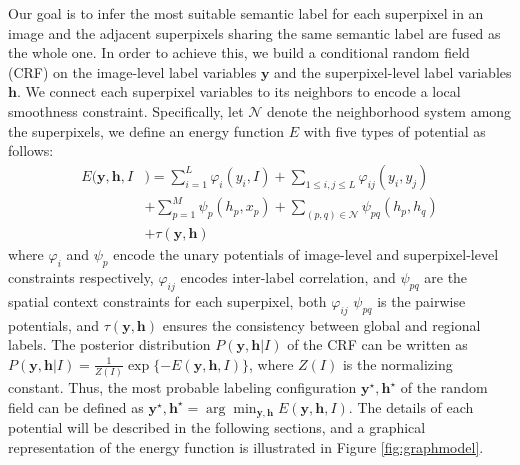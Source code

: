 Our goal is to infer the most suitable semantic label for each superpixel in an image and the adjacent superpixels sharing the same semantic label are fused as the whole one.
In order to achieve this, we build a conditional random field (CRF) on the image-level label variables $\boldsymbol{y}$ and the superpixel-level label variables $\boldsymbol{h}$.
We connect each superpixel variables to its neighbors to encode a local smoothness constraint.
Specifically, let $\mathcal{N}$ denote the neighborhood system among the superpixels, we define an energy function $E$ with five types of potential as follows:
\begin{equation}
    \label{eq:energyfunction}
    \begin{aligned}
        E(\boldsymbol{y},\boldsymbol{h},I&) = \sum_{i=1}^L{\varphi_{i}(y_i,I)}
                            + \sum_{1 \le i,j \le L} {\varphi_{ij}(y_i,y_j)}\\ &+ \sum_{p=1}^M{\psi_{p}(h_p,x_p)}+ \sum_{(p,q) \in \mathcal{N}}{\psi_{pq}(h_p,h_q)}\\ &+ \tau(\boldsymbol{y},\boldsymbol{h})
    \end{aligned}
\end{equation}
where $\varphi_{i}$ and $\psi_{p}$ encode the unary potentials of image-level and superpixel-level constraints respectively,    $\varphi_{ij}$ encodes inter-label correlation,  and $\psi_{pq}$ are the spatial context constraints for each superpixel,  both $\varphi_{ij}$ $\psi_{pq}$ is the pairwise potentials, and $\tau(\boldsymbol{y},\boldsymbol{h})$ ensures the consistency between global and regional labels.
The posterior distribution $P(\boldsymbol{y},\boldsymbol{h}|I)$ of the CRF can be written as $P(\boldsymbol{y},\boldsymbol{h}|I) = \frac{1}{Z(I)}\exp{\{-E(\boldsymbol{y},\boldsymbol{h},I)\}}$, where $Z(I)$ is the normalizing constant.
Thus, the most probable labeling configuration $\boldsymbol{y}^{\star},\boldsymbol{h}^{\star}$ of the random field can be defined as  $\boldsymbol{y}^{\star},\boldsymbol{h}^{\star} = \arg \min_{\boldsymbol{y},\boldsymbol{h}} E(\boldsymbol{y},\boldsymbol{h},I)$.
The details of each potential will be described in the following sections, and a graphical representation of the energy function is illustrated in Figure \ref{fig:graphmodel}.


